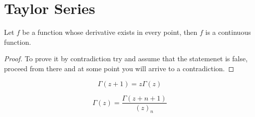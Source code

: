 \section{Taylor Series}


\begin{theorem}
    Let $f$ be a function whose derivative exists in every point, then $f$
    is a continuous function.
\end{theorem}

\begin{proof}
    To prove it by contradiction try and assume that the statemenet is false,
    proceed from there and at some point you will arrive to a contradiction.
\end{proof}

$$\Gamma (z+1) = z \Gamma (z)$$

$$\Gamma (z) = \frac {\Gamma (z+n+1)}{(z)_n}$$